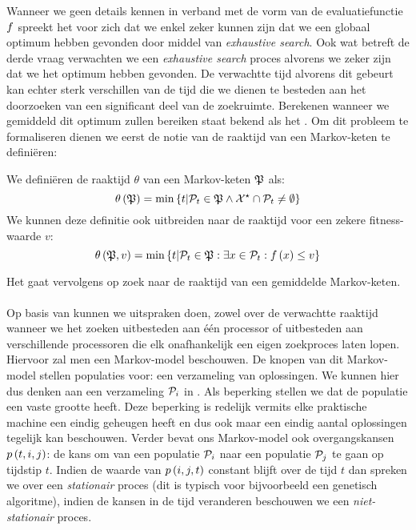Wanneer we geen details kennen in verband met de vorm van de evaluatiefunctie $f$ spreekt het voor zich dat we enkel zeker kunnen zijn dat we een globaal optimum hebben gevonden door middel van \emph{exhaustive search}. Ook wat betreft de derde vraag verwachten we een \emph{exhaustive search} proces alvorens we zeker zijn dat we het optimum hebben gevonden. De verwachtte tijd alvorens dit gebeurt kan echter sterk verschillen van de tijd die we dienen te besteden aan het doorzoeken van een significant deel van de zoekruimte. Berekenen wanneer we gemiddeld dit optimum zullen bereiken staat bekend als het . Om dit probleem te formaliseren dienen we eerst de notie van de raaktijd van een Markov-keten te defini\"eren:

\begin{definition}
We defini\"eren de raaktijd $\theta$ van een Markov-keten $\mathfrak{P}$ als:
\begin{equation}
\theta\left(\mathfrak{P}\right)=\min\left\{ t|\mathcal{P}_t\in\mathfrak{P}\wedge\mathcal{X}^{\star}\cap \mathcal{P}_t\neq\emptyset\right\}
\end{equation}
We kunnen deze definitie ook uitbreiden naar de raaktijd voor een zekere fitness-waarde $v$:
\begin{equation}
\theta\left(\mathfrak{P},v\right)=\min\left\{ t|\mathcal{P}_t\in\mathfrak{P}:\exists x\in \mathcal{P}_t:f\left(x\right)\leq v\right\}
\end{equation}
\end{definition}

Het  gaat vervolgens op zoek naar de raaktijd van een gemiddelde Markov-keten.

\paragraph{}
Op basis van  kunnen we uitspraken doen, zowel over de verwachtte raaktijd wanneer we het zoeken uitbesteden aan \'e\'en processor of uitbesteden aan verschillende processoren die elk onafhankelijk een eigen zoekproces laten lopen. Hiervoor zal men een Markov-model beschouwen. De knopen van dit Markov-model stellen populaties voor: een verzameling van oplossingen. We kunnen hier dus denken aan een verzameling $\mathcal{P}_i$ in . Als beperking stellen we dat de populatie een vaste grootte heeft. Deze beperking is redelijk vermits elke praktische machine een eindig geheugen heeft en dus ook maar een eindig aantal oplossingen tegelijk kan beschouwen. Verder bevat ons Markov-model ook overgangskansen $p\left(t,i,j\right)$: de kans om van een populatie $\mathcal{P}_i$ naar een populatie $\mathcal{P}_j$ te gaan op tijdstip $t$. Indien de waarde van $p\left(i,j,t\right)$ constant blijft over de tijd $t$ dan spreken we over een \emph{stationair} proces (dit is typisch voor bijvoorbeeld een genetisch algoritme), indien de kansen in de tijd veranderen beschouwen we een \emph{niet-stationair} proces.
